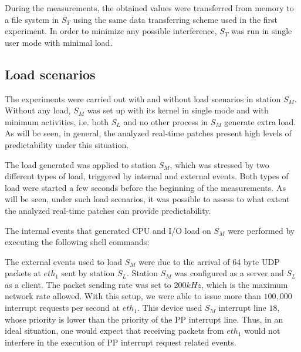 \documentclass{acm_proc_article-sp}
\begin{document}
During the measurements, the obtained values were transferred from memory to a file
system in $S_T$ using the same data transferring scheme used in the first
experiment. In order to minimize any possible interference, $S_T$ was run in single
user mode with minimal load.

\subsection{Load scenarios}
\label{sec:carga}

The experiments were carried out with and without load scenarios in station
$S_M$. Without any load, $S_M$ was set up with its kernel in single mode and with
minimum activities, i.e. both $S_L$ and no other process in $S_M$ generate extra
load. As will be seen, in general, the analyzed real-time patches present high
levels of predictability under this situation.

The load generated was applied to station $S_M$, which was stressed by two different
types of load, triggered by internal and external events. Both types of load were
started a few seconds before the beginning of the measurements.  As will be
seen, under such load scenarios, it was possible to assess to what extent the
analyzed real-time patches can provide predictability.

The internal events that generated CPU and I/O load on $S_M$ were performed by
executing the following shell commands:


The external events used to load $S_M$ were due to the arrival of 64 byte UDP
packets at $eth_1$ sent by station $S_L$. Station $S_M$ was configured as a server
and $S_L$ as a client. The packet sending rate was set to $200 kHz$, which is the
maximum network rate allowed. With this setup, we were able to issue more than
$100,000$ interrupt requests per second at $eth_1$. This device used $S_M$ interrupt
line $18$, whose priority is lower than the priority of the PP interrupt line. Thus,
in an ideal situation, one would expect that receiving packets from $eth_1$ would
not interfere in the execution of PP interrupt request related events.
\end{document}
